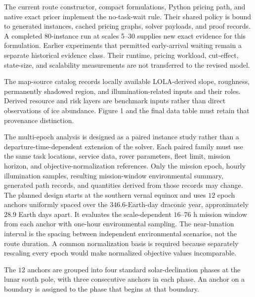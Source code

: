 \documentclass[
  11pt,
]{article}
\begin{document}
The current route constructor, compact formulations, Python pricing
path, and native exact pricer implement the no-task-wait rule. Their
shared policy is bound to generated instances, cached pricing graphs,
solver payloads, and proof records. A completed 80-instance run at
scales 5--30 supplies new exact evidence for this formulation. Earlier
experiments that permitted early-arrival waiting remain a separate
historical evidence class. Their runtime, pricing workload, cut-effect,
state-size, and scalability measurements are not transferred to the
revised model.

The map-source catalog records locally available LOLA-derived slope,
roughness, permanently shadowed region, and illumination-related inputs
and their roles. Derived resource and risk layers are benchmark inputs
rather than direct observations of ice abundance. Figure 1 and the final
data table must retain that provenance distinction.

The multi-epoch analysis is designed as a paired instance study rather
than a departure-time-dependent extension of the solver. Each paired
family must use the same task locations, service data, rover parameters,
fleet limit, mission horizon, and objective-normalization references.
Only the mission epoch, hourly illumination samples, resulting
mission-window environmental summary, generated path records, and
quantities derived from those records may change. The planned design
starts at the southern vernal equinox and uses \(12\) epoch anchors
uniformly spaced over the \(346.6\)-Earth-day draconic year,
approximately \(28.9\) Earth days apart. It evaluates the
scale-dependent \(16\)--\(76\) h mission window from each anchor with
one-hour environmental sampling. The near-lunation interval is the
spacing between independent environmental scenarios, not the route
duration. A common normalization basis is required because separately
rescaling every epoch would make normalized objective values
incomparable.

The \(12\) anchors are grouped into four standard solar-declination
phases at the lunar south pole, with three consecutive anchors in each
phase. An anchor on a boundary is assigned to the phase that begins at
that boundary.
\end{document}
